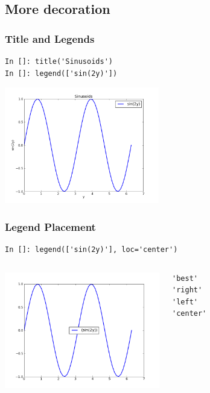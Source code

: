 \documentclass[14pt,compress]{beamer}
\begin{document}
\subsection{More decoration}
\begin{frame}[fragile]
\frametitle{Title and Legends}
\vspace*{-0.15in}
\begin{lstlisting}
In []: title('Sinusoids')
In []: legend(['sin(2y)'])
\end{lstlisting}
  \vspace*{-0.1in}
  \begin{center}
  \includegraphics[height=2in, interpolate=true]{data/legend}
  \end{center}
\end{frame}

\begin{frame}[fragile]
\frametitle{Legend Placement}
\begin{block}{}
    \small
\begin{lstlisting}
In []: legend(['sin(2y)'], loc='center')
\end{lstlisting}
\end{block}

\begin{columns}
 \includegraphics[height=2in, interpolate=true]{data/position}
\vspace{-0.2in}
\begin{lstlisting}
'best'
'right'
'left'
'center'
\end{lstlisting}
\end{columns}
\end{frame}
\end{document}
